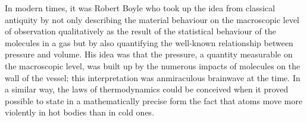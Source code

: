 \documentclass[12pt]{article}
\begin{document}
\hfill

In modern times, it was Robert Boyle who took up the idea from classical antiquity
by not only describing the material behaviour on the macroscopic level of observation
qualitatively as the result of the statistical behaviour of the molecules in a gas but by
also quantifying the well-known relationship between pressure and volume. His idea
was that the pressure, a quantity measurable on the macroscopic level, was built up
by the numerous impacts of molecules on the wall of the vessel; this interpretation
was anmiraculous brainwave at the time. In a similar way, the laws of thermodynamics
could be conceived when it proved possible to state in a mathematically precise
form the fact that atoms move more violently in hot bodies than in cold ones.

\hfill
\end{document}
